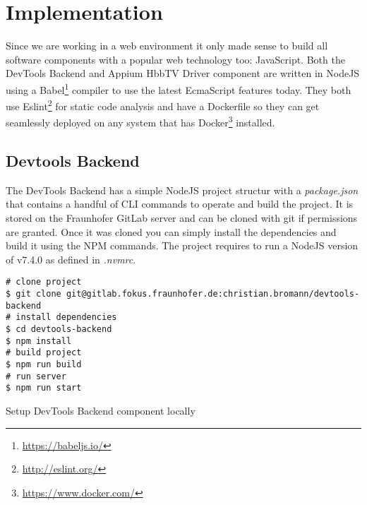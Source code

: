 %

\chapter{Implementation\label{cha:implementation}}

Since we are working in a web environment it only made sense to build all software components with a
popular web technology too: JavaScript. Both the DevTools Backend and Appium HbbTV Driver component
are written in NodeJS using a Babel\footnote{\url{https://babeljs.io/}} compiler to use the latest
EcmaScript features today. They both use Eslint\footnote{\url{http://eslint.org/}} for static code
analysis and have a Dockerfile so they can get seamlessly deployed on any system that has Docker\footnote{\url{https://www.docker.com/}}
installed.

\section{Devtools Backend\label{sec:implDevtoolsBackend}}

The DevTools Backend has a simple NodeJS project structur with a \textit{package.json} that contains
a handful of CLI commands to operate and build the project. It is stored on the Fraunhofer GitLab
server and can be cloned with git if permissions are granted. Once it was cloned you can simply install
the dependencies and build it using the NPM commands. The project requires to run a NodeJS version
of v7.4.0 as defined in \textit{.nvmrc}.

\vspace{1cm}
\begin{listing}[H]
\begin{verbatim}
# clone project
$ git clone git@gitlab.fokus.fraunhofer.de:christian.bromann/devtools-backend
# install dependencies
$ cd devtools-backend
$ npm install
# build project
$ npm run build
# run server
$ npm run start
\end{verbatim}
\caption{Setup DevTools Backend component locally}
\label{lst:setupdevtools}
\end{listing}
\vspace{0.5cm}

